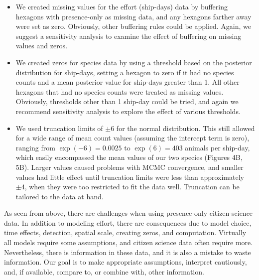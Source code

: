 \documentclass[11pt, titlepage]{article}
\begin{document}
\begin{spacing}{1.9}
\begin{flushleft}
\begin{itemize}
  \item We created missing values for the effort (ship-days) data by buffering hexagons with presence-only as missing data, and any hexagons farther away were set as zero.  Obviously, other buffering rules could be applied.  Again, we suggest a sensitivity analysis to examine the effect of buffering on missing values and zeros.
  \item We created zeros for species data by using a threshold based on the posterior distribution for ship-days, setting a hexagon to zero if it had no species counts and a mean posterior value for ship-days greater than 1.  All other hexagons that had no species counts were treated as missing values.  Obviously, thresholds other than 1 ship-day could be tried, and again we recommend sensitivity analysis to explore the effect of various thresholds.
  \item We used truncation limits of $\pm6$ for the normal distribution. This still allowed for a wide range of mean count values (assuming the intercept term is zero), ranging from $\exp(-6) = 0.0025$ to $\exp(6) = 403$ animals per ship-day, which easily encompassed the mean values of our two species (Figures 4B, 5B). Larger values caused problems with MCMC convergence, and smaller values had little effect until truncation limits were less than approximately $\pm4$, when they were too restricted to fit the data well. Truncation can be tailored to the data at hand.
\end{itemize}

As seen from above, there are challenges when using presence-only citizen-science data.  In addition to modeling effort, there are consequences due to model choice, time effects, detection, spatial scale, creating zeros, and computation. Virtually all models require some assumptions, and citizen science data often require more. Nevertheless, there is information in these data, and it is also a mistake to waste information. Our goal is to make appropriate assumptions, interpret cautiously, and, if available, compare to, or combine with, other information.  


\end{flushleft}
\end{spacing}
\end{document}
